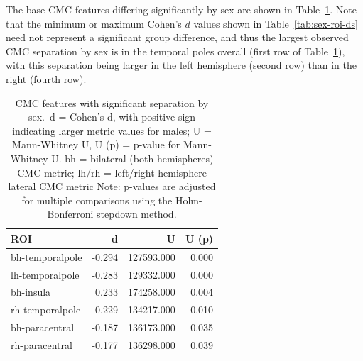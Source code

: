 \documentclass{article}
\newcommand{\CMC}{\(\text{CMC}\) }
\begin{document}
The base \CMC features differing significantly by sex are shown in
Table~\ref{tab:sig-cmc-sex}. Note that the minimum or maximum Cohen's \(d\)
values shown in Table~\ref{tab:sex-roi-ds} need not represent a significant
group difference, and thus the largest observed \CMC separation by sex is in
the temporal poles overall (first row of Table~\ref{tab:sig-cmc-sex}), with
this separation being larger in the left hemisphere (second row) than in the
right (fourth row).


\begin{table}[H]
\centering
\begin{tabular}{lrrr}
	\toprule
	ROI & d & U & U (p) \\
	\midrule
	bh-temporalpole & -0.294 & 127593.000 & 0.000 \\
	lh-temporalpole & -0.283 & 129332.000 & 0.000 \\
	bh-insula       &  0.233 & 174258.000 & 0.004 \\
	rh-temporalpole & -0.229 & 134217.000 & 0.010 \\
	bh-paracentral  & -0.187 & 136173.000 & 0.035 \\
	rh-paracentral  & -0.177 & 136298.000 & 0.039 \\
	\bottomrule
\end{tabular}
\footnotesize
\caption{CMC features with significant separation by sex.\
d = Cohen's d, with positive sign indicating larger metric values for males;
U = Mann-Whitney U, U (p) = p-value for Mann-Whitney U.
bh = bilateral (both hemispheres) CMC metric;
lh/rh = left/right hemisphere lateral CMC metric
Note: p-values are adjusted for multiple comparisons using the
Holm-Bonferroni stepdown method.} \label{tab:sig-cmc-sex}
\normalsize
\end{table}

\end{document}
